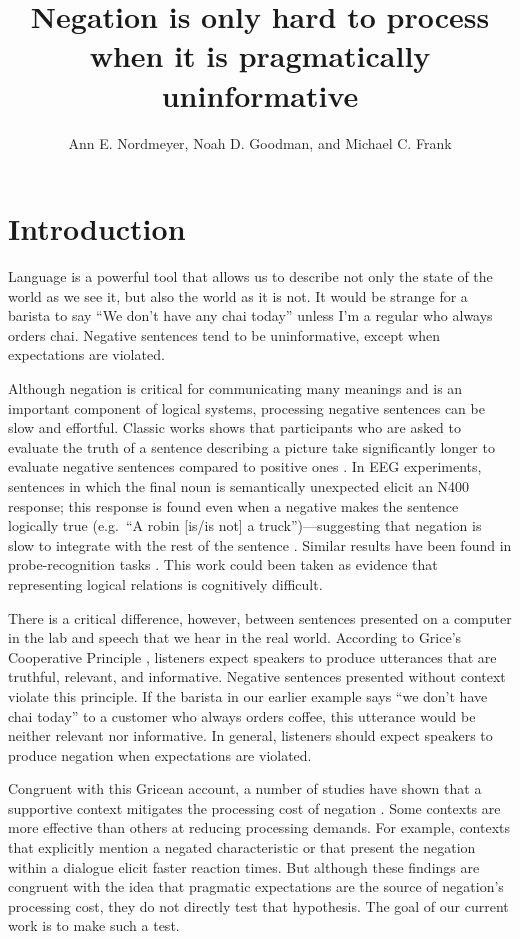 \documentclass[man]{apa2}
\title{Negation is only hard to process when it is pragmatically uninformative}
\author{Ann E. Nordmeyer, Noah D. Goodman, and Michael C. Frank}
\affiliation{Department of Psychology, Stanford University}
\begin{document}
\maketitle

\section{Introduction}

Language is a powerful tool that allows us to describe not only the state of the world as we see it, but also the world as it is not.  It would be strange for a barista to say ``We don't have any chai today'' unless I'm a regular who always orders chai.  Negative sentences tend to be uninformative, except when expectations are violated.

Although negation is critical for communicating many meanings and is an important component of logical systems, processing negative sentences can be slow and effortful.  Classic works shows that participants who are asked to evaluate the truth of a sentence describing a picture take significantly longer to evaluate negative sentences compared to positive ones \cite{hclark1972, carpenter1975, just1971, just1976}. In EEG experiments, sentences in which the final noun is semantically unexpected elicit an N400 response; this response is found even when a negative makes the sentence logically true (e.g.\ ``A robin [is/is not] a truck'')---suggesting that negation is slow to integrate with the rest of the sentence \cite{fischler1983, ludtke2008}.  Similar results have been found in probe-recognition tasks \cite{kaup2003, kaup2006, hasson2006}. This work could been taken as evidence that representing logical relations is cognitively difficult.

There is a critical difference, however, between sentences presented on a computer in the lab and speech that we hear in the real world. According to Grice's Cooperative Principle \cite{grice1975}, listeners expect speakers to produce utterances that are truthful, relevant, and informative.  Negative sentences presented without context violate this principle.  If the barista in our earlier example says ``we don't have chai today'' to a customer who always orders coffee, this utterance would be neither relevant nor informative.  In general, listeners should expect speakers to produce negation when expectations are violated.

Congruent with this Gricean account, a number of studies have shown that a supportive context mitigates the processing cost of negation \cite{wason1965, glenberg1999, ludtke2006, nieuwland2008, dale2011}. Some contexts are more effective than others at reducing processing demands. For example, contexts that explicitly mention a negated characteristic \cite{ludtke2006} or that present the negation within a dialogue \cite{dale2011} elicit faster reaction times.  But although these findings are congruent with the idea that pragmatic expectations are the source of negation's processing cost, they do not directly test that hypothesis.  The goal of our current work is to make such a test.
\end{document}
